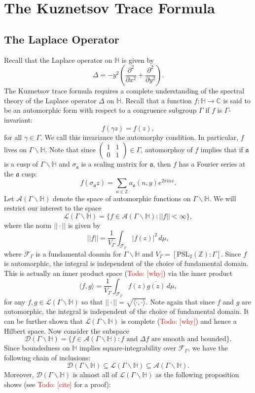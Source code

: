 \documentclass[12pt]{book}
\theoremstyle{definition}\newframedtheorem{method}{Method}
\newcommand{\mf}{\mathfrak}
\newcommand{\mc}{\mathcal}
\newcommand{\PSL}{\mathrm{PSL}}
\newcommand{\Z}{\mathbb{Z}}
\newcommand{\C}{\mathbb{C}}
\renewcommand{\H}{\mathbb{H}}
\newcommand{\g}{\gamma}
\newcommand{\s}{\sigma}
\newcommand{\G}{\Gamma}
\newcommand{\D}{\Delta}
\newcommand{\del}{\partial}
\newcommand{\<}{\langle}
\renewcommand{\>}{\rangle}
\newcommand{\conj}{\overline}
\newcommand{\GH}{\G\backslash\H}
\newcommand{\todo}[1]{\textcolor{red}{\sf Todo: [#1]}}
\begin{document}
  \section{The Kuznetsov Trace Formula}
    \subsection*{The Laplace Operator}
      Recall that the Laplace operator on $\H$ is given by
      \[
        \D = -y^{2}\left(\frac{\del^{2}}{\del x^{2}}+\frac{\del^{2}}{\del y^{2}}\right).
      \]
      The Kuznetsov trace formula requires a complete understanding of the spectral theory of the Laplace operator $\D$ on $\H$. Recall that a function $f:\H \to \C$ is said to be an automorphic form with respect to a congruence subgroup $\G$ if $f$ is $\G$-invariant:
      \[
        f(\g z) = f(z),
      \]
      for all $\g \in \G$. We call this invariance the automorphy condition. In particular, $f$ lives on $\GH$. Note that since $\begin{pmatrix} 1 & 1 \\ 0 & 1 \end{pmatrix} \in \G$, automorphoy of $f$ implies that if $\mf{a}$ is a cusp of $\GH$ and $\s_{\mf{a}}$ is a scaling matrix for $\mf{a}$, then $f$ has a Fourier series at the $\mf{a}$ cusp:
      \[
        f(\s_{\mf{a}}z) = \sum_{n \in \Z}a_{\mf{a}}(n,y)e^{2\pi inx}.
      \]
      Let $\mc{A}(\GH)$ denote the space of automorphic functions on $\GH$. We will restrict our interest to the space
      \[
        \mc{L}(\GH) = \{f \in \mc{A}(\GH):||f|| < \infty\},
      \]
      where the norm $||\cdot||$ is given by
      \[
        ||f|| = \frac{1}{V_{\G}}\int_{\mc{F}_{\G}}|f(z)|^{2}\,d\mu,
      \]
      where $\mc{F}_{\G}$ is a fundamental doamin for $\GH$ and $V_{\G} = [\PSL_{2}(\Z):\G]$. Since $f$ is automorphic, the integral is independent of the choice of fundamental domain. This is actually an inner product space (\todo{why}) via the inner product
      \[
        \<f,g\> = \frac{1}{V_{\G}}\int_{\mc{F}_{\G}}f(z)\conj{g(z)}\,d\mu,
      \]
      for any $f,g \in \mc{L}(\GH)$ so that $||\cdot|| = \sqrt{\<\cdot,\cdot\>}$. Note again that since $f$ and $g$ are automorphic, the integral is independent of the choice of fundamental domain. It can be further shown that $\mc{L}(\GH)$ is complete (\todo{why}) and hence a Hilbert space. Now consider the subspace
      \[
        \mc{D}(\GH) = \{f \in \mc{A}(\GH):\text{$f$ and $\D f$ are smooth and bounded}\}.
      \]
      Since boundedness on $\H$ implies square-integrability over $\mc{F}_{\G}$, we have the following chain of inclusions:
      \[
        \mc{D}(\GH) \subseteq \mc{L}(\GH) \subseteq \mc{A}(\GH).
      \]
      Moreover, $\mc{D}(\GH)$ is almost all of $\mc{L}(\GH)$ as the following proposition shows (see \todo{cite} for a proof):
\end{document}
